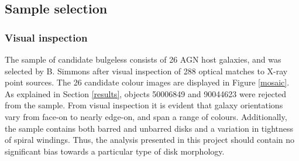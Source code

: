 \documentclass[11pt,twocolumn]{article}
\begin{document}

\subsection{Sample selection}
\subsubsection{Visual inspection}
The sample of candidate bulgeless consists of 26 AGN host galaxies, and was selected by B. Simmons after visual inspection of 288 optical matches to X-ray point sources. The 26 candidate colour images are displayed in Figure \ref{mosaic}. As explained in Section \ref{results}, objects 50006849 and 90044623 were rejected from the sample. From visual inspection it is evident that galaxy orientations vary from face-on to nearly edge-on, and span a range of colours.  Additionally, the sample contains both barred and unbarred disks and a variation in tightness of spiral windings. Thus, the analysis presented in this project should contain no significant bias towards a particular type of disk morphology. 
\end{document}

